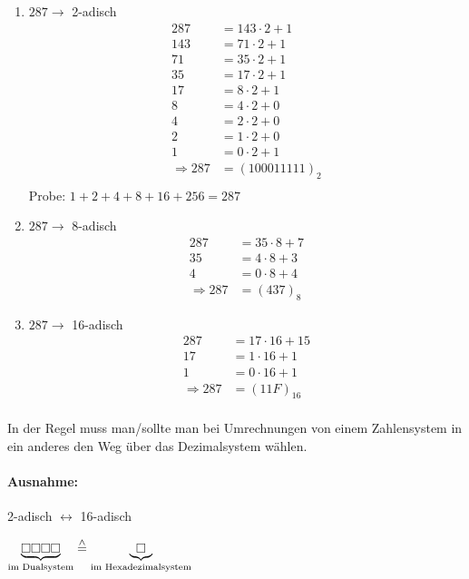 \clearpage
\Bsps
\begin{enumerate}
	\item $287\rightarrow$ 2-adisch\\
	\begin{align*}
	287&= 143\cdot 2 + 1\\
	143&= 71\cdot 2 + 1\\
	71&= 35\cdot 2 + 1\\
	35&= 17\cdot 2 + 1\\
	17&= 8\cdot 2 + 1\\
	8&= 4\cdot 2 + 0\\
	4&= 2\cdot 2 + 0\\
	2&= 1\cdot 2 + 0\\
	1&= 0\cdot 2 + 1\\
	\Rightarrow 287 &= (100011111)_2\\
	\end{align*}
	Probe: $1+2+4+8+16+256 = 287$
	
	\item $287\rightarrow$ 8-adisch\\
	\begin{align*}
	287&= 35\cdot 8 + 7\\
	35&= 4\cdot 8 + 3\\
	4&= 0\cdot 8 + 4\\
	\Rightarrow 287 &= (437)_8
	\end{align*}
	
	\item $287\rightarrow$ 16-adisch\\
	\begin{align*}
	287&= 17\cdot 16 + 15\\
	17&= 1\cdot 16 + 1\\
	1&= 0\cdot 16 + 1\\
	\Rightarrow 287 &= (11F)_{16}\\
	\end{align*}
\end{enumerate}

\Bem In der Regel muss man/sollte man bei Umrechnungen von einem Zahlensystem in ein anderes den Weg über das Dezimalsystem wählen.

\paragraph{Ausnahme:} 2-adisch $\leftrightarrow$ 16-adisch

\Idee $\underbrace{\square\square\square\square}_\text{im Dualsystem} \stackrel{\wedge}{=} \underbrace{\square}_\text{im Hexadezimalsystem}$

